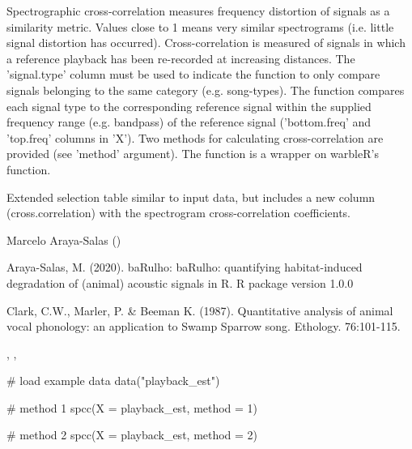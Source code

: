 \documentclass[letterpaper]{book}
\begin{document}
%
\begin{Details}\relax
Spectrographic cross-correlation measures frequency distortion of signals as a similarity metric. Values close to 1 means very similar spectrograms (i.e. little signal distortion has occurred). Cross-correlation is measured of signals in which a reference playback has been re-recorded at increasing distances. The 'signal.type' column must be used to indicate the function to only compare signals belonging to the same category (e.g. song-types). The function compares each signal type to the corresponding reference signal within the supplied frequency range (e.g. bandpass) of the reference signal ('bottom.freq' and 'top.freq' columns in 'X'). Two methods for calculating cross-correlation are provided (see 'method' argument). The function is a wrapper on warbleR's  function.
\end{Details}
%
\begin{Value}
Extended selection table similar to input data, but includes a new column (cross.correlation)
with the spectrogram cross-correlation coefficients.
\end{Value}
%
\begin{Author}\relax
Marcelo Araya-Salas ()
\end{Author}
%
\begin{References}\relax

Araya-Salas, M. (2020). baRulho: baRulho: quantifying habitat-induced degradation of (animal) acoustic signals in R. R package version 1.0.0

Clark, C.W., Marler, P. \& Beeman K. (1987). Quantitative analysis of animal vocal phonology: an application to Swamp Sparrow song. Ethology. 76:101-115. 

\end{References}
%
\begin{SeeAlso}\relax
{}, , 
\end{SeeAlso}
%
\begin{Examples}
\begin{ExampleCode}
{
# load example data
data("playback_est")

# method 1
spcc(X = playback_est, method = 1)

# method 2
spcc(X = playback_est, method = 2)
}

\end{ExampleCode}
\end{Examples}
\end{document}
